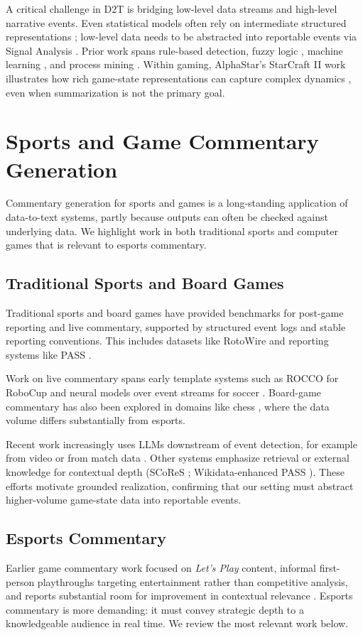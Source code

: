 A critical challenge in D2T is bridging low-level data streams and high-level narrative events. Even statistical models often rely on intermediate structured representations \cite{chiang2025}; low-level data needs to be abstracted into reportable events via Signal Analysis \cite{portet2008}. Prior work spans rule-based detection, fuzzy logic \cite{ramos2019}, machine learning \cite{zhang2024}, and process mining \cite{zelst2021}. Within gaming, AlphaStar's StarCraft II work illustrates how rich game-state representations can capture complex dynamics \cite{mathieu2023}, even when summarization is not the primary goal.

\section{Sports and Game Commentary Generation}
Commentary generation for sports and games is a long-standing application of data-to-text systems, partly because outputs can often be checked against underlying data. We highlight work in both traditional sports and computer games that is relevant to esports commentary.

\subsection{Traditional Sports and Board Games}
Traditional sports and board games have provided benchmarks for post-game reporting and live commentary, supported by structured event logs and stable reporting conventions. This includes datasets like RotoWire \cite{wiseman2017} and reporting systems like PASS \cite{vanderlee2017}.

Work on live commentary spans early template systems such as ROCCO for RoboCup \cite{voelz1998} and neural models over event streams for soccer \cite{taniguchi2019}. Board-game commentary has also been explored in domains like chess \cite{zheng2025}, where the data volume differs substantially from esports.

Recent work increasingly uses LLMs downstream of event detection, for example from video \cite{andrews2024} or from match data \cite{cook2024}. Other systems emphasize retrieval or external knowledge for contextual depth (SCoReS \cite{lee2013}; Wikidata-enhanced PASS \cite{gatti2018}). These efforts motivate grounded realization, confirming that our setting must abstract higher-volume game-state data into reportable events.

\subsection{Esports Commentary}
Earlier game commentary work focused on \textit{Let's Play} content, informal first-person playthroughs targeting entertainment rather than competitive analysis, and reports substantial room for improvement in contextual relevance \cite{guzdial2018,shah2019,li2019}. Esports commentary is more demanding: it must convey strategic depth to a knowledgeable audience in real time. We review the most relevant work below.

